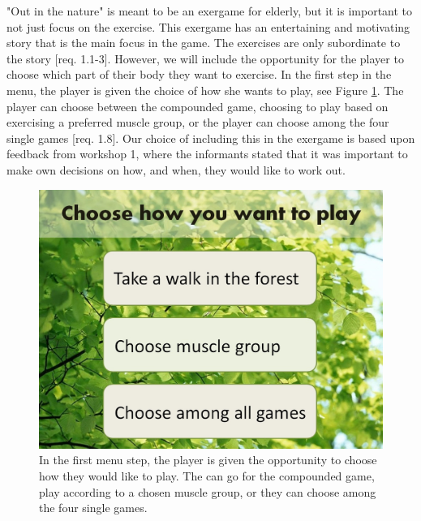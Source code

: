 "Out in the nature" is meant to be an exergame for elderly, but it is important to not just focus on the exercise. This exergame has an entertaining and motivating story that is the main focus in the game. The exercises are only subordinate to the story [req. 1.1-3]. However, we will include the opportunity for the player to choose which part of their body they want to exercise. In the first step in the menu, the player is given the choice of how she wants to play, see Figure \ref{fig:menuStart}. The player can choose between the compounded game, choosing to play based on exercising a preferred muscle group, or the player can choose among the four single games [req. 1.8]. Our choice of including this in the exergame is based upon feedback from workshop 1, where the informants stated that it was important to make own decisions on how, and when, they would like to work out.                     

\begin{figure} [H]
\centering
\includegraphics[scale=0.24]{choosePlay.jpg}
\caption[The menu - start]{In the first menu step, the player is given the opportunity to choose how they would like to play. The can go for the compounded game, play according to a chosen muscle group, or they can choose among the four single games.}
\label{fig:menuStart}
\end{figure} 

